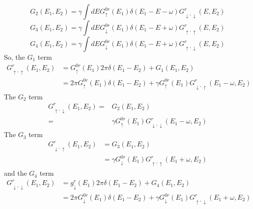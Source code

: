 \documentclass[11pt,a4paper]{article}
\begin{document}
\begin{equation}
G_{2}(E_{1},E_{2}) = \gamma\int dE G_{ \uparrow}^{0r} \left(E_{1}\right)  \delta(E_{1}-E-\omega) G_{ \downarrow, \downarrow}^{r}(E,E_{2})
\end{equation}
\begin{equation}
G_{3}(E_{1},E_{2}) =  \gamma \int dE G_{ \downarrow}^{0r}\left(E_{1}\right)  \delta(E_{1}-E+\omega) G_{ \uparrow, \uparrow}^{r}(E,E_{2})
\end{equation}
\begin{equation}
G_{4}(E_{1},E_{2}) = \gamma\int dE G_{ \downarrow}^{0r}\left(E_{1}\right)  \delta(E_{1}-E+\omega) G_{ \uparrow, \downarrow}^{r}(E,E_{2})
\end{equation}
So, the $G_{1}$ term
\begin{equation}
\begin{split}
G_{ \uparrow, \uparrow}^{r}(E_{1}, E_{2}) &= G_{ \uparrow}^{0r}\left(E_{1}\right) 2 \pi \delta\left(E_{1}-E_{2}\right) + G_{1}\left(E_{1}, E_{2}\right) \\
&= 2 \pi G_{ \uparrow}^{0r}\left(E_{1}\right) \delta\left(E_{1}-E_{2}\right) + \gamma G_{ \uparrow}^{0r}\left(E_{1}\right)  G_{ \downarrow, \uparrow}^{r}\left(E_{1}-\omega, E_{2}\right)
\end{split}
\end{equation}
The $G_{2}$ term
\begin{equation}
\begin{split}
G_{ \uparrow, \downarrow}^{r}\left(E_{1}, E_{2}\right) =& G_{2}\left(E_{1}, E_{2}\right) \\
=& \gamma G_{ \uparrow}^{0r} \left(E_{1}\right) G_{ \downarrow, \downarrow}^{r}(E_{1}-\omega,E_{2})
\end{split}
\end{equation}
The $G_{3}$ term
\begin{equation}
\begin{split}
G_{ \downarrow, \uparrow}^{r}\left(E_{1}, E_{2}\right) &= G_{3}\left(E_{1}, E_{2}\right) \\
&= \gamma G_{ \downarrow}^{0r} \left(E_{1}\right) G_{ \uparrow, \uparrow}^{r}(E_{1}+\omega,E_{2})
\end{split}
\end{equation}
and the $G_{4}$ term
\begin{equation}
\begin{split}
G_{ \downarrow, \downarrow}^{r}\left(E_{1}, E_{2}\right) &= g_{ \downarrow}^{r}\left(E_{1}\right) 2 \pi \delta\left(E_{1}-E_{2}\right) +G_{4}\left(E_{1}, E_{2}\right)\\
&= 2 \pi G_{ \downarrow}^{0r}\left(E_{1}\right) \delta\left(E_{1}-E_{2}\right) + \gamma G_{ \downarrow}^{0r}(E_{1}) G_{ \uparrow, \downarrow}^{r}(E_{1}+\omega, E_{2})
\end{split}
\end{equation}
\end{document}

